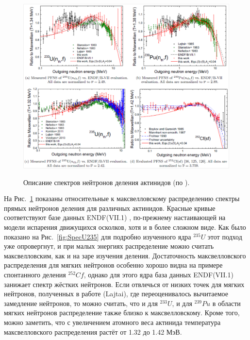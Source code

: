 \documentclass[a4paper,12pt]{article}
\begin{document}
\begin{large}
    \begin{figure}[ht]
    {
       \includegraphics[width=0.90\linewidth]{images/SpecActinid}
    }
    \caption{Описание спектров нейтронов деления актинидов (по \cite{Capote16}).}
    \label{fig:SpecActinid}
  \end{figure}
  На Рис.~\ref{fig:SpecActinid} показаны относительные к максвелловскому распределению спектры прямых нейтронов деления для различных актинидов.
  Красные кривые соответствуют базе данных ENDF(VII.1) \cite{ENDF/B-VII.1}, по-прежнему настаивающей на модели испарения движущихся осколков, хотя и в более сложном виде.
  Как было показано на Рис.~\ref{fig:SpecU235} для подробно изученного ядра $^{235}U$ этот подход уже опровергнут, и при малых энергиях распределение можно считать максвелловским, как и на заре изучения деления.
  Достаточность максвелловского распределения для мягких нейтронов особенно хорошо видна на примере спонтанного деления $^{252}Cf$, однако для этого ядра база данных ENDF(VII.1) \cite{ENDF/B-VII.1} занижает спектр жёстких нейтронов.
  Если отвлечься от низких точек для мягких нейтронов, полученных в работе \cite{Lajtai85} (Lajtai), где переоценивалось вычитаемое замедление нейтронов, то можно считать, что и для $^{233}U$, и для $^{239}Pu$ в области мягких нейтронов распределение также близко к максвелловскому.
  Кроме того, можно заметить, что с увеличением атомного веса актинида температура  максвелловского распределения растёт от 1.32 до 1.42 МэВ.
  

\end{large}
\end{document}
